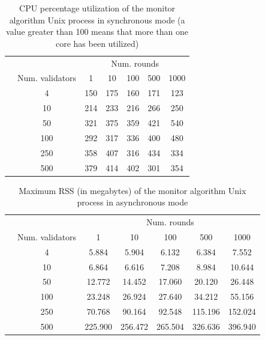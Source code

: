 \documentclass[a4paper,11pt,oneside]{report}
\begin{document}
\begin{table}[]
\centering
\begin{tabular}{l|c|c|c|c|c|c|}
\cline{2-7}
                  &  & \multicolumn{5}{c|}{Num. rounds} \\ \cline{2-7} 
\multirow{7}{*}{} & Num. validators & 1   & 10   & 100  & 500  & 1000  \\ \cline{2-7} 
                  & 4               & 150  & 175  & 160 & 171 & 123      \\ \cline{2-7} 
                  & 10              & 214    & 233     &  216   & 266  & 250      \\ \cline{2-7} 
                  & 50              & 321    & 375    & 359     &  421    &  540     \\ \cline{2-7} 
                  & 100             & 292  & 317    & 336  & 400     & 480      \\ \cline{2-7} 
                  & 250             &  358   & 407     &  316    &  434    &  334     \\ \cline{2-7} 
                  & 500             & 379    & 414     &  402    &  301    & 354      \\ \cline{2-7} 
\end{tabular}
\caption{CPU percentage utilization of the monitor algorithm Unix process in synchronous mode (a value greater than 100 means that more than one core has been utilized)}
\end{table}

\begin{table}[]
\centering
\begin{tabular}{l|c|c|c|c|c|c|}
\cline{2-7}
                  &  & \multicolumn{5}{c|}{Num. rounds} \\ \cline{2-7} 
\multirow{7}{*}{} & Num. validators & 1   & 10   & 100  & 500  & 1000  \\ \cline{2-7} 
                  & 4               & 5.884 & 5.904  & 6.132 & 6.384  & 7.552       \\ \cline{2-7} 
                  & 10              & 6.864   & 6.616   & 7.208  & 8.984  &  10.644     \\ \cline{2-7} 
                  & 50              & 12.772    & 14.452     & 17.060      &  20.120    & 26.448      \\ \cline{2-7} 
                  & 100             & 23.248    & 26.924     & 27.640     & 34.212     &   55.156    \\ \cline{2-7} 
                  & 250             & 70.768    &  90.164    & 92.548     & 115.196      & 152.024      \\ \cline{2-7} 
                  & 500             &  225.900   &  256.472    & 265.504     &  326.636    &  396.940     \\ \cline{2-7} 
\end{tabular}
\caption{Maximum RSS (in megabytes) of the monitor algorithm Unix process in asynchronous mode}
\end{table}
\end{document}
